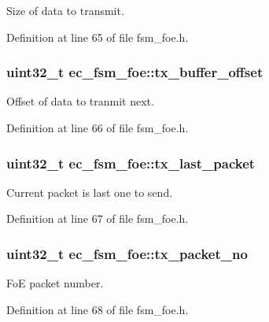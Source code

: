 \-Size of data to transmit. 



\-Definition at line 65 of file fsm\-\_\-foe.\-h.

\subsubsection[{tx\-\_\-buffer\-\_\-offset}]{\setlength{\rightskip}{0pt plus 5cm}uint32\-\_\-t {\bf ec\-\_\-fsm\-\_\-foe\-::tx\-\_\-buffer\-\_\-offset}}\label{structec__fsm__foe_af01ef503eebc97048e1eb67bf5fed201}


\-Offset of data to tranmit next. 



\-Definition at line 66 of file fsm\-\_\-foe.\-h.

\subsubsection[{tx\-\_\-last\-\_\-packet}]{\setlength{\rightskip}{0pt plus 5cm}uint32\-\_\-t {\bf ec\-\_\-fsm\-\_\-foe\-::tx\-\_\-last\-\_\-packet}}\label{structec__fsm__foe_aa4137f668dc4033561be82316a117d8e}


\-Current packet is last one to send. 



\-Definition at line 67 of file fsm\-\_\-foe.\-h.

\subsubsection[{tx\-\_\-packet\-\_\-no}]{\setlength{\rightskip}{0pt plus 5cm}uint32\-\_\-t {\bf ec\-\_\-fsm\-\_\-foe\-::tx\-\_\-packet\-\_\-no}}\label{structec__fsm__foe_a80ee572b78695906bfe1df61cda4bb4a}


\-Fo\-E packet number. 



\-Definition at line 68 of file fsm\-\_\-foe.\-h.

